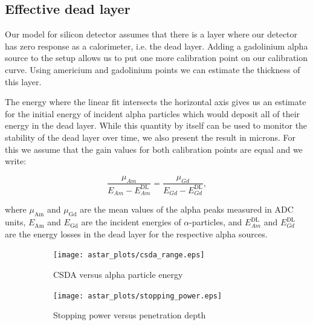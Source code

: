 \documentclass[a4paper,12pt]{article}
\begin{document}
\subsection{Effective dead layer}

Our model for silicon detector assumes that there is a layer where our detector
has zero response as a calorimeter, i.e. the dead layer. Adding a gadolinium alpha
source to the setup allows us to put one more calibration point on our
calibration curve. Using americium and gadolinium points we can estimate
the thickness of this layer.

The energy where the linear fit intersects the horizontal axis gives us an
estimate for the initial energy of incident alpha particles which would deposit
all of their energy in the dead layer. While this quantity by itself can be used
to monitor the stability of the dead layer over time, we also present the result
in microns. For this we assume that the gain values for both calibration points
are equal and we write:

\begin{equation}
\frac{\mu_{Am}}{E_{Am} - E^\text{DL}_{Am}} = \frac{\mu_{Gd}}{E_{Gd} - E^\text{DL}_{Gd}},
\label{eq:gain_equality}
\end{equation}

\noindent where $\mu_\text{Am}$ and $\mu_\text{Gd}$ are the mean values of the
alpha peaks measured in ADC units, $E_\text{Am}$ and $E_\text{Gd}$ are the
incident energies of $\alpha$-particles, and $E^\text{DL}_{Am}$ and
$E^\text{DL}_{Gd}$ are the energy losses in the dead layer for the respective
alpha sources.

\begin{figure}
\begin{subfigure}[b]{0.5\textwidth}
\texttt{[image: astar\_plots/csda\_range.eps]}
\caption{CSDA versus alpha particle energy}\label{subfig:csda_range}
\end{subfigure}
\begin{subfigure}[b]{0.5\textwidth}
\texttt{[image: astar\_plots/stopping\_power.eps]}
\caption{Stopping power versus penetration depth}\label{subfig:stopping_power}
\end{subfigure}
\caption{}\label{fig:astar_plots}
\end{figure}
\end{document}
